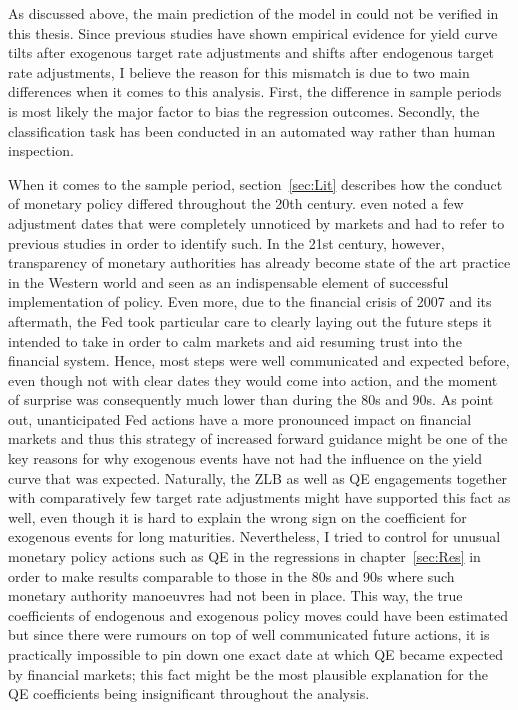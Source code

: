 
As discussed above, the main prediction of the model in \textcite{Ellingsen.2001} could not be verified in this thesis. Since previous studies have shown empirical evidence for yield curve tilts after exogenous target rate adjustments and shifts after endogenous target rate adjustments, I believe the reason for this mismatch is due to two main differences when it comes to this analysis. First, the difference in sample periods is most likely the major factor to bias the regression outcomes. Secondly, the classification task has been conducted in an automated way rather than human inspection.

When it comes to the sample period, section~\ref{sec:Lit} describes how the conduct of monetary policy differed throughout the 20th century. \textcite{Ellingsen.2003} even noted a few adjustment dates that were completely unnoticed by markets and had to refer to previous studies in order to identify such. In the 21st century, however, transparency of monetary authorities has already become state of the art practice in the Western world and seen as an indispensable element of successful implementation of policy. Even more, due to the financial crisis of 2007 and its aftermath, the Fed took particular care to clearly laying out the future steps it intended to take in order to calm markets and aid resuming trust into the financial system. Hence, most steps were well communicated and expected before, even though not with clear dates they would come into action, and the moment of surprise was consequently much lower than during the 80s and 90s. As \textcite{Ellingsen.2003} point out, unanticipated Fed actions have a more pronounced impact on financial markets and thus this strategy of increased forward guidance might be one of the key reasons for why exogenous events have not had the influence on the yield curve that was expected. Naturally, the ZLB as well as QE engagements together with comparatively few target rate adjustments might have supported this fact as well, even though it is hard to explain the wrong sign on the coefficient for exogenous events for long maturities. Nevertheless, I tried to control for unusual monetary policy actions such as QE in the regressions in chapter~\ref{sec:Res} in order to make results comparable to those in the 80s and 90s where such monetary authority manoeuvres had not been in place. This way, the true coefficients of endogenous and exogenous policy moves could have been estimated but since there were rumours on top of well communicated future actions, it is practically impossible to pin down one exact date at which QE became expected by financial markets; this fact might be the most plausible explanation for the QE coefficients being insignificant throughout the analysis.

